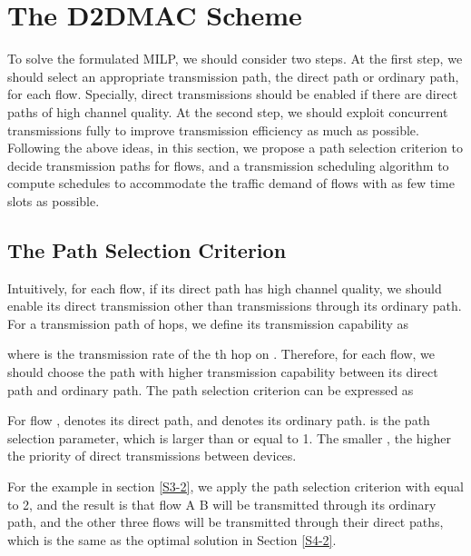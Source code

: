 \documentclass[journal]{IEEEtran}
\begin{document}
\section{The D2DMAC Scheme}\label{S5}

To solve the formulated MILP, we should consider two steps. At the first step, we should select an
appropriate transmission path, the direct path or ordinary path, for each flow. Specially, direct transmissions should be enabled if there are direct paths of high channel quality. At the second
step, we should exploit concurrent transmissions fully to improve transmission
efficiency as much as possible. Following the above ideas, in this section, we propose a path
selection criterion to decide transmission paths for flows, and a transmission scheduling algorithm
to compute schedules to accommodate the traffic demand of flows with as few time slots as possible.




\subsection{The Path Selection Criterion}\label{S5-1}


Intuitively, for each flow, if its direct path has high channel quality, we should enable its
direct transmission other than transmissions through its ordinary path. For a transmission path 
of  hops, we define its transmission capability as


where  is the transmission rate of the th hop on . Therefore, for each flow, we should
choose the path with higher transmission capability between its direct path and ordinary path. The
path selection criterion can be expressed as


For flow ,  denotes its direct path, and  denotes its ordinary path. 
is the path selection parameter, which is larger than or equal to 1. The smaller , the
higher the priority of direct transmissions between devices.



For the example in section \ref{S3-2}, we apply the path selection criterion with  equal to
2, and the result is that flow A  B will be transmitted through its ordinary path, and the
other three flows will be transmitted through their direct paths, which is the same as the optimal
solution in Section \ref{S4-2}.
\end{document}
